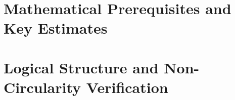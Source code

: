\documentclass[11pt,a4paper]{report}
\begin{document}




\chapter{Mathematical Prerequisites and Key Estimates}
\label{ch:math-prerequisites}
% 
% 
% 

\chapter{Logical Structure and Non-Circularity Verification}
\label{ch:verification}

% 
% 

\end{document}

